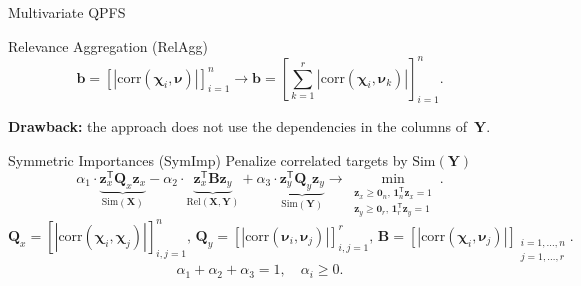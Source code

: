 \documentclass[9pt]{beamer}
\newcommand{\bz}{\mathbf{z}}
\newcommand{\bb}{\mathbf{b}}
\newcommand{\bY}{\mathbf{Y}}
\newcommand{\bX}{\mathbf{X}}
\newcommand{\bB}{\mathbf{B}}
\newcommand{\bQ}{\mathbf{Q}}
\newcommand{\bchi}{\boldsymbol{\chi}}
\newcommand{\bnu}{\boldsymbol{\nu}}
\newcommand{\bOne}{\boldsymbol{1}}
\newcommand{\bZero}{\boldsymbol{0}}
\newcommand{\T}{\mathsf{T}}
\begin{document}
\begin{frame}{Multivariate QPFS}
\begin{block}{Relevance Aggregation (RelAgg)}
	\[
	\bb = \left[\left|\text{corr}(\bchi_i, \bnu)\right|\right]_{i=1}^n \rightarrow \bb = \left[\sum_{k=1}^r\left|\text{corr}(\bchi_i, \bnu_k)\right|\right]_{i=1}^n.
	\]
\end{block}
{\bf Drawback:} the approach does not use the dependencies in the columns of~$\bY$. 

\begin{block}{Symmetric Importances (SymImp)}
	Penalize correlated targets by $\text{Sim} (\bY)$
	\[
	\alpha_1 \cdot \underbrace{\bz_x^{\T} \bQ_x \bz_x}_{\text{Sim}(\bX)} - \alpha_2 \cdot \underbrace{\bz_x^{\T} \bB \bz_y}_{\text{Rel}(\bX, \bY)} + \alpha_3 \cdot \underbrace{\bz_y^{\T} \bQ_y \bz_y}_{\text{Sim}(\bY)} \rightarrow \min_{\substack{\bz_x \geq \bZero_n, \, \bOne_n^{\T}\bz_x=1 \\ \bz_y \geq \bZero_r, \, \bOne_r^{\T}\bz_y=1}}.
	\]
	\[
	\bQ_x = \left[ \left| \text{corr}(\bchi_i, \bchi_j) \right| \right]_{i,j=1}^n, \,
	\bQ_y = \left[ \left| \text{corr}(\bnu_i, \bnu_j) \right| \right]_{i,j=1}^r, \,
	\bB =  \left[ \left| \text{corr}(\bchi_i, \bnu_j) \right| \right]_{\substack{i=1, \dots, n \\ j=1, \dots, r}}.
	\]
	\[
	\alpha_1 + \alpha_2 + \alpha_3 = 1, \quad \alpha_i \geq 0.
	\] 
\end{block}
\end{frame}
\end{document}
